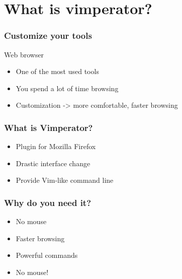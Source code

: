 \section{What is vimperator?}
\setcounter{subsection}{1}

\begin{frame}
\frametitle{Customize your tools}
  Web browser
  \begin{itemize}[<+->]
    \item One of the most used tools
    \item You spend a lot of time browsing
    \item Customization -> more comfortable, faster browsing
  \end{itemize}
\end{frame}

\begin{frame}
\frametitle{What is Vimperator?}
  \begin{itemize}[<+->]
    \item Plugin for Mozilla Firefox
    \item Drastic interface change
    \item Provide Vim-like command line
  \end{itemize}
\end{frame}

\begin{frame}
\frametitle{Why do you need it?}
  \begin{itemize}[<+->]
    \item No mouse
    \item Faster browsing
    \item Powerful commands
    \item No mouse!
  \end{itemize}
\end{frame}

